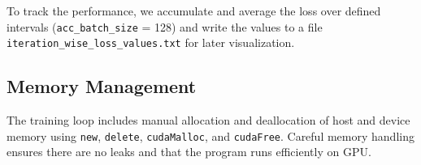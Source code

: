To track the performance, we accumulate and average the loss over defined intervals (\texttt{acc\_batch\_size} = 128) and write the values to a file \texttt{iteration\_wise\_loss\_values.txt} for later visualization.

\subsection{Memory Management}

The training loop includes manual allocation and deallocation of host and device memory using \texttt{new}, \texttt{delete}, \texttt{cudaMalloc}, and \texttt{cudaFree}. Careful memory handling ensures there are no leaks and that the program runs efficiently on GPU.


